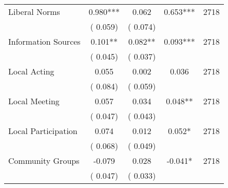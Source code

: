 \begin{tabular}{l*{4}{c}}
 Liberal Norms &              0.980*** &         0.062 &           0.653*** & 2718                       \\  
                 &        (       0.059)                   &        (       0.074)                        &                                                             &                                                      \\      

 Information Sources &              0.101** &         0.082** &           0.093*** & 2718                       \\  
                 &        (       0.045)                   &        (       0.037)                        &                                                             &                                                      \\      

 Local Acting &              0.055 &         0.002 &           0.036 & 2718                       \\  
                 &        (       0.084)                   &        (       0.059)                        &                                                             &                                                      \\      

 Local Meeting &              0.057 &         0.034 &           0.048** & 2718                       \\  
                 &        (       0.047)                   &        (       0.043)                        &                                                             &                                                      \\      

 Local Participation &              0.074 &         0.012 &           0.052* & 2718                       \\  
                 &        (       0.068)                   &        (       0.049)                        &                                                             &                                                      \\      

 Community Groups &             -0.079 &         0.028 &          -0.041* & 2718                       \\  
                 &        (       0.047)                   &        (       0.033)                        &                                                             &                                                      \\      

\hline \end{tabular}                                                                                                              
